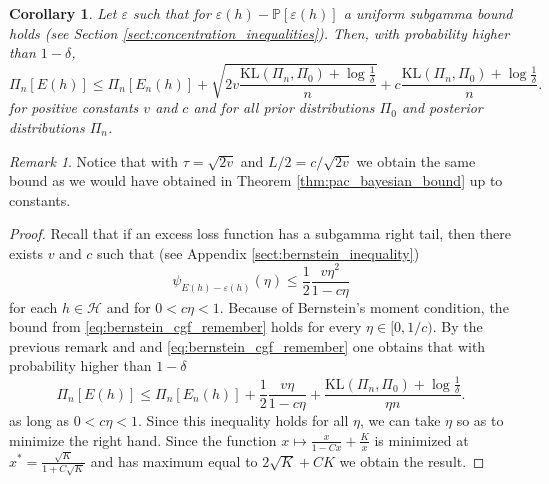 \documentclass{uvamath}
\newcommand*{\calH}{\mathcal{H}}
\newcommand*{\bbP}{\mathbb{P}}
\newcommand*{\sqbrack}[1]{\left[#1\right]}
\newcommand*{\KL}{\mathrm{KL}}
\newtheorem{corollary}[theorem]{Corollary}
\theoremstyle{remark}
\newtheorem{remark}[theorem]{Remark}
\theoremstyle{definition}
\theoremstyle{definition}
\theoremstyle{definition}
\theoremstyle{definition}
\theoremstyle{definition}
\begin{document}
\begin{corollary}\label{cor:risk_subgamma}
  Let $\varepsilon$ such that for
  $\varepsilon(h)-\bbP[\varepsilon(h)]$ a uniform subgamma bound holds
  (see Section \ref{sect:concentration_inequalities}). Then, with
  probability higher than $1-\delta$,
  \begin{equation*}
    \Pi_n\sqbrack{E(h)}
    \leq
    \Pi_n\sqbrack{E_n(h)} + \sqrt{2v\frac{\KL(\Pi_n, \Pi_0) + \log\frac{1}{\delta}}{n}}  +
    c\frac{\KL(\Pi_n, \Pi_0) + \log\frac{1}{\delta}}{ n}.
  \end{equation*}
  for positive constants $v$ and $c$ and for all prior distributions
  $\Pi_0$ and posterior distributions $\Pi_n$.
\end{corollary}
\begin{remark}
  Notice that with $\tau = \sqrt{2v}$ and $L/2 = c/\sqrt{2v}$ we
  obtain the same bound as we would have obtained in Theorem
  \ref{thm:pac_bayesian_bound} up to constants.
\end{remark}
\begin{proof}
  Recall that if an excess loss function has a subgamma right tail,
  then there exists $v$ and $c$ such that (see Appendix
  \ref{sect:bernstein_inequality})
  \begin{equation}\label{eq:bernstein_cgf_remember}
    \psi_{E(h) - \varepsilon(h)}(\eta) \leq \frac{1}{2}\frac{v\eta^2}{1-c\eta}
  \end{equation}
  for each $h\in\calH$ and for $0<c\eta<1$.  Because of Bernstein's
  moment condition, the bound from \eqref{eq:bernstein_cgf_remember}
  holds for every $\eta \in [0,1/c)$. By the previous remark and and
  \eqref{eq:bernstein_cgf_remember} one obtains that with probability
  higher than $1-\delta$
  \begin{equation*}
    \Pi_n\sqbrack{E(h)}
    \leq
    \Pi_n\sqbrack{E_n(h)} + \frac{1}{2}\frac{v\eta}{1-c\eta}  +
    \frac{\KL(\Pi_n, \Pi_0) + \log\frac{1}{\delta}}{\eta n}.
  \end{equation*}
  as long as $0<c\eta<1$. Since this inequality holds for all $\eta$,
  we can take $\eta$ so as to minimize the right hand. Since the
  function $x\mapsto \frac{x}{1-Cx} + \frac{K}{x}$ is minimized at
  $x^* = \frac{\sqrt{K}}{1+C\sqrt{K}}$ and has maximum equal to
  $2\sqrt{K} + CK$ we obtain the result.
\end{proof}
\end{document}
